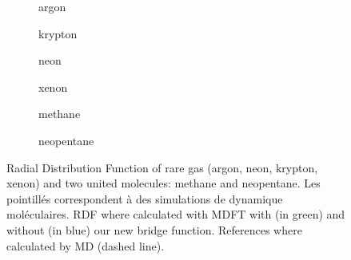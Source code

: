 \begin{figure}
    \begin{subfigure}[b]{0.25\textwidth}
        \centering
        \resizebox{\linewidth}{!}{
        }
        \caption{argon}
    \end{subfigure}%
    \begin{subfigure}[b]{0.25\textwidth}
    \centering
        \resizebox{\linewidth}{!}{
        }
        \caption{krypton}
    \end{subfigure}
    \begin{subfigure}[b]{0.25\textwidth}
        \centering
        \resizebox{\linewidth}{!}{
        }
        \caption{neon}
    \end{subfigure}%
    \begin{subfigure}[b]{0.25\textwidth}
        \centering
        \resizebox{\linewidth}{!}{
        }
        \caption{xenon}
    \end{subfigure}
    \begin{subfigure}[b]{0.25\textwidth}
        \centering
        \resizebox{\linewidth}{!}{
        }
        \caption{methane}
    \end{subfigure}%
    \begin{subfigure}[b]{0.25\textwidth}
        \centering
        \resizebox{\linewidth}{!}{
        }
        \caption{neopentane}
    \end{subfigure}
    \caption{Radial Distribution Function of rare gas (argon, neon, krypton, xenon) and two united molecules: methane and neopentane. Les pointillés correspondent à des simulations de dynamique moléculaires. RDF where calculated with MDFT with (in green) and without (in blue) our new bridge function. References where calculated by MD (dashed line).}
    \label{fig:g_of_r_complete}
\end{figure}

